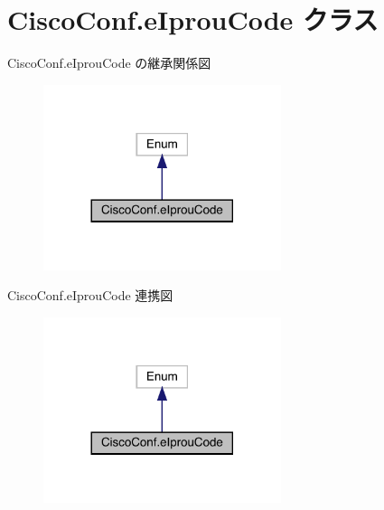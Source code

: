\hypertarget{classCiscoConf_1_1eIprouCode}{}\section{Cisco\+Conf.\+e\+Iprou\+Code クラス}
\label{classCiscoConf_1_1eIprouCode}


Cisco\+Conf.\+e\+Iprou\+Code の継承関係図
\nopagebreak
\begin{figure}[H]
\begin{center}
\leavevmode
\includegraphics[width=197pt]{classCiscoConf_1_1eIprouCode__inherit__graph}
\end{center}
\end{figure}


Cisco\+Conf.\+e\+Iprou\+Code 連携図
\nopagebreak
\begin{figure}[H]
\begin{center}
\leavevmode
\includegraphics[width=197pt]{classCiscoConf_1_1eIprouCode__coll__graph}
\end{center}
\end{figure}
